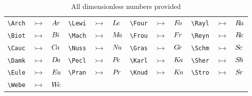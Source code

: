         \begin{table}[H]
            \centering
            \caption{All dimensionless numbers provided}
            \begin{tabular}{lll|lll|lll|lll}
                \verb|\Arch| & $\rightarrowtail $ & ${A\kern-.06em r}$ &
                \verb|\Lewi| & $\rightarrowtail $ & ${L\kern-.05em e}$ &
                \verb|\Four| & $\rightarrowtail $ & ${F\kern-.20em o}$ &
                \verb|\Rayl| & $\rightarrowtail $ & ${R\kern-.10em a}$ \\
                \verb|\Biot| & $\rightarrowtail $ & ${B\kern-.08em i}$ &
                \verb|\Mach| & $\rightarrowtail $ & ${M\kern-.20em a}$ &
                \verb|\Frou| & $\rightarrowtail $ & ${F\kern-.07em r}$ &
                \verb|\Reyn| & $\rightarrowtail $ & ${R\kern-.10em e}$ \\
                \verb|\Cauc| & $\rightarrowtail $ & ${C\kern-.13em a}$ &
                \verb|\Nuss| & $\rightarrowtail $ & ${N\kern-.15em u}$ &
                \verb|\Gras| & $\rightarrowtail $ & ${G\kern-.12em r}$ &
                \verb|\Schm| & $\rightarrowtail $ & ${S\kern-.12em c}$ \\
                \verb|\Damk| & $\rightarrowtail $ & ${D\kern-.12em a}$ &
                \verb|\Pecl| & $\rightarrowtail $ & ${P\kern-.15em e}$ &
                \verb|\Karl| & $\rightarrowtail $ & ${K\kern-.15em a}$ &
                \verb|\Sher| & $\rightarrowtail $ & ${S\kern-.12em h}$ \\
                \verb|\Eule| & $\rightarrowtail $ & ${E\kern-.09em u}$ &
                \verb|\Pran| & $\rightarrowtail $ & ${P\kern-.10em r}$ &
                \verb|\Knud| & $\rightarrowtail $ & ${K\kern-.13em n}$ &
                \verb|\Stro| & $\rightarrowtail $ & ${S\kern-.09em r}$ \\
                \verb|\Webe| & $\rightarrowtail $ & ${W\kern-.25em e}$ &
                &&&&&&&&
            \end{tabular}
        \end{table}






\endgroup